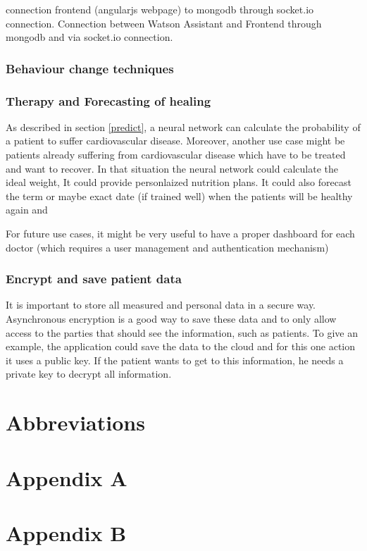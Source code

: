 connection frontend (angularjs webpage) to mongodb through socket.io connection.
Connection between Watson Assistant and Frontend through mongodb and via socket.io connection.
\subsection{Behaviour change techniques}
\subsection{Therapy and Forecasting of healing}
As described in section \ref{predict}, a neural network can calculate the probability of a patient to suffer cardiovascular disease.
Moreover, another use case might be patients already suffering from cardiovascular disease which have to be treated and want to recover. In that situation the neural network could calculate the ideal weight,
It could provide personlaized nutrition plans. It could also forecast the term or maybe exact date (if trained well) when the patients will be healthy again and  

For future use cases, it might be very useful to have a proper dashboard for each doctor (which requires a user management and authentication mechanism) 

\subsection{Encrypt and save patient data}

It is important to store all measured and personal data in a secure way. Asynchronous encryption is a good way to save these data and to only allow access to the parties that should see the information, such as patients. To give an example, the application could save the data to the cloud and for this one action it uses a public key. If the patient wants to get to this information, he needs a private key to decrypt all information. 



\chapter{Abbreviations}


\printbibliography[heading=bibintoc]

\chapter{Appendix A}\label{appendix a}

\chapter{Appendix B}\label{appendix b}



